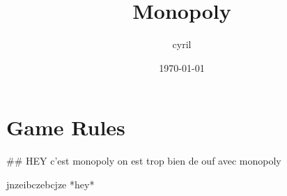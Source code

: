 \documentclass{article}%
\title{Monopoly}%
\author{cyril}%
\date{\today}%
\begin{document}
%
\pagestyle{empty}%
\normalsize%
\maketitle%
\section{Game Rules}%
\label{sec:GameRules}%
\#\# HEY c'est monopoly on est trop bien de ouf avec monopoly
\newline%

\newline%
jnzeibczebcjze *hey*

%
\end{document}
